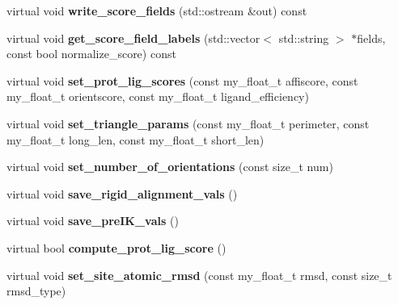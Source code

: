 \begin{CompactItemize}
\item 
virtual void \textbf{write\_\-score\_\-fields} (std::ostream \&out) const \label{classASCbase_1_1rigid__align__t_c02636bc474643f5ceb468212ce470db}

\item 
virtual void \textbf{get\_\-score\_\-field\_\-labels} (std::vector$<$ std::string $>$ $\ast$fields, const bool normalize\_\-score) const \label{classASCbase_1_1rigid__align__t_c276978bf665b4f8899893f929333acf}

\item 
virtual void \textbf{set\_\-prot\_\-lig\_\-scores} (const my\_\-float\_\-t affiscore, const my\_\-float\_\-t orientscore, const my\_\-float\_\-t ligand\_\-efficiency)\label{classASCbase_1_1rigid__align__t_ab98b09f549c3700c63a772e495c8858}

\item 
virtual void \textbf{set\_\-triangle\_\-params} (const my\_\-float\_\-t perimeter, const my\_\-float\_\-t long\_\-len, const my\_\-float\_\-t short\_\-len)\label{classASCbase_1_1rigid__align__t_46db34052a8e92e8b9455b4d3adc4fa4}

\item 
virtual void \textbf{set\_\-number\_\-of\_\-orientations} (const size\_\-t num)\label{classASCbase_1_1rigid__align__t_482bac50e100ac69fb62edd5b3ff6775}

\item 
virtual void \textbf{save\_\-rigid\_\-alignment\_\-vals} ()\label{classASCbase_1_1rigid__align__t_b05738bb2695109d10c7b553ac7b4e42}

\item 
virtual void \textbf{save\_\-pre\-IK\_\-vals} ()\label{classASCbase_1_1rigid__align__t_8d323747e24f9374c1a94b364c3c415d}

\item 
virtual bool \textbf{compute\_\-prot\_\-lig\_\-score} ()\label{classASCbase_1_1rigid__align__t_b14c62f28834c0c953753b108954052e}

\item 
virtual void \textbf{set\_\-site\_\-atomic\_\-rmsd} (const my\_\-float\_\-t rmsd, const size\_\-t rmsd\_\-type)\label{classASCbase_1_1rigid__align__t_7f27991120704fa2a19cb8a7cf31ce55}

\end{CompactItemize}
